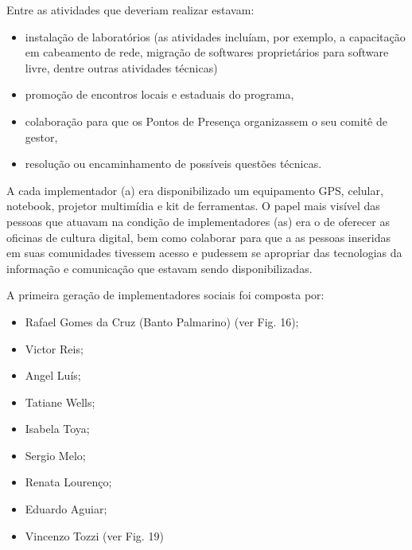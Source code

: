 Entre as atividades que deveriam realizar estavam:


\begin{itemize}
\item instalação de laboratórios (as atividades incluíam, por exemplo, a capacitação em cabeamento de rede, migração de softwares proprietários para software livre, dentre outras atividades técnicas)
\item promoção de encontros locais e estaduais do programa,
\item colaboração para que os  Pontos de Presença organizassem o seu comitê de gestor,
\item resolução ou encaminhamento de possíveis questões técnicas.
\end{itemize}

A cada implementador (a) era disponibilizado um equipamento GPS, celular, notebook, projetor multimídia e kit de ferramentas. O papel mais visível das pessoas que atuavam na condição de implementadores (as) era o de oferecer as oficinas de cultura digital, bem como colaborar para que a as pessoas inseridas em suas comunidades tivessem acesso e pudessem se apropriar das tecnologias da informação e comunicação que estavam sendo disponibilizadas.


\noindent\begin{center}\mbox{\centering{}}\end{center}


A  primeira geração de implementadores  sociais foi composta por:


\begin{itemize}
\item Rafael Gomes da Cruz (Banto Palmarino) (ver Fig. 16);
\item Victor Reis;
\item Angel Luís;
\item Tatiane Wells;
\item Isabela Toya;
\item Sergio Melo;
\item Renata Lourenço;
\item Eduardo Aguiar;
\item Vincenzo Tozzi (ver Fig. 19)
\end{itemize}

